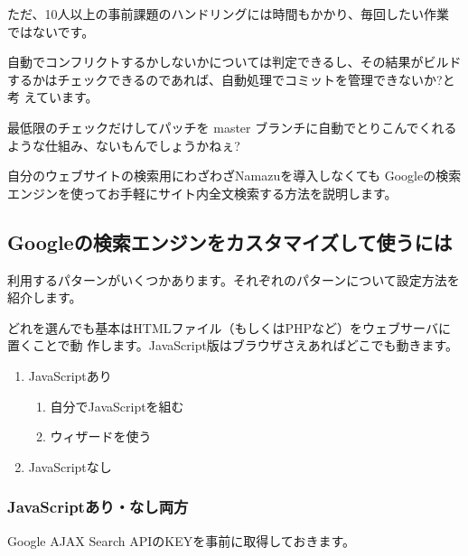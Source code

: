 \documentclass[mingoth,a4paper]{jsarticle}
\begin{document}
ただ、10人以上の事前課題のハンドリングには時間もかかり、毎回したい作業
ではないです。

自動でコンフリクトするかしないかについては判定できるし、その結果がビルド
するかはチェックできるのであれば、自動処理でコミットを管理できないか?と考
えています。

最低限のチェックだけしてパッチを master ブランチに自動でとりこんでくれる
ような仕組み、ないもんでしょうかねぇ?


自分のウェブサイトの検索用にわざわざNamazuを導入しなくても
Googleの検索エンジンを使ってお手軽にサイト内全文検索する方法を説明します。

\subsection{Googleの検索エンジンをカスタマイズして使うには}

利用するパターンがいくつかあります。それぞれのパターンについて設定方法を
紹介します。

どれを選んでも基本はHTMLファイル（もしくはPHPなど）をウェブサーバに置くことで動
作します。JavaScript版はブラウザさえあればどこでも動きます。

\begin{enumerate}
\item JavaScriptあり
\begin{enumerate}
\item 自分でJavaScriptを組む
\item ウィザードを使う
\end{enumerate}
\item JavaScriptなし
\end{enumerate}


\subsubsection{JavaScriptあり・なし両方}
Google AJAX Search APIのKEYを事前に取得しておきます。
\end{document}
